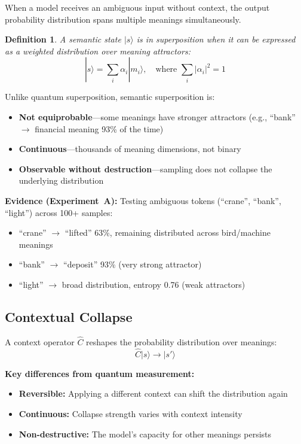 \documentclass[11pt,a4paper]{article}
\newtheorem{definition}{Definition}
\newcommand{\ket}[1]{|#1\rangle}
\newcommand{\chat}{\hat{C}}
\begin{document}
When a model receives an ambiguous input without context, the output probability distribution spans multiple meanings simultaneously.

\begin{definition}
A semantic state $\ket{s}$ is in superposition when it can be expressed as a weighted distribution over meaning attractors:
\begin{equation}
\ket{s} = \sum_i \alpha_i \ket{m_i}, \quad \text{where } \sum_i |\alpha_i|^2 = 1
\end{equation}
\end{definition}

Unlike quantum superposition, semantic superposition is:
\begin{itemize}
\item \textbf{Not equiprobable}---some meanings have stronger attractors (e.g., ``bank'' $\to$ financial meaning 93\% of the time)
\item \textbf{Continuous}---thousands of meaning dimensions, not binary
\item \textbf{Observable without destruction}---sampling does not collapse the underlying distribution
\end{itemize}

\textbf{Evidence (Experiment~A):} Testing ambiguous tokens (``crane'', ``bank'', ``light'') across 100+ samples:
\begin{itemize}
\item ``crane'' $\to$ ``lifted'' 63\%, remaining distributed across bird/machine meanings
\item ``bank'' $\to$ ``deposit'' 93\% (very strong attractor)
\item ``light'' $\to$ broad distribution, entropy 0.76 (weak attractors)
\end{itemize}

\subsection{Contextual Collapse}

A context operator $\chat$ reshapes the probability distribution over meanings:
\begin{equation}
\chat\ket{s} \to \ket{s'}
\end{equation}

\textbf{Key differences from quantum measurement:}
\begin{itemize}
\item \textbf{Reversible:} Applying a different context can shift the distribution again
\item \textbf{Continuous:} Collapse strength varies with context intensity
\item \textbf{Non-destructive:} The model's capacity for other meanings persists
\end{itemize}
\end{document}
